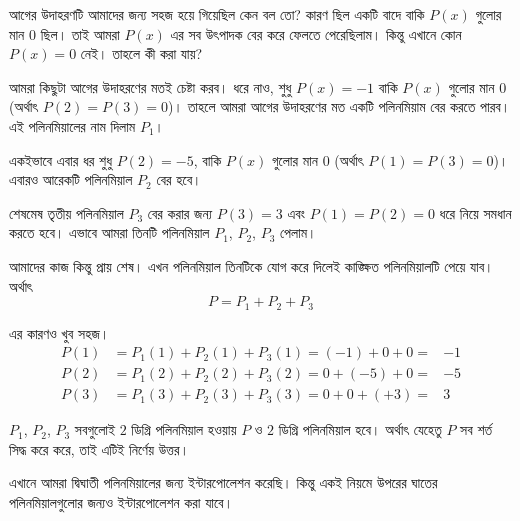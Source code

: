 \begin{solution}
আগের উদাহরণটি আমাদের জন্য সহজ হয়ে গিয়েছিল কেন বল তো? কারণ ছিল একটি বাদে বাকি $P(x)$ গুলোর মান $0$ ছিল। তাই আমরা $P(x)$ এর সব উৎপাদক বের করে ফেলতে পেরেছিলাম। কিন্তু এখানে কোন $P(x) = 0$ নেই। তাহলে কী করা যায়? 

আমরা কিছুটা আগের উদাহরণের মতই চেষ্টা করব। ধরে নাও, শুধু $P(x) = -1$ বাকি $P(x)$ গুলোর মান $0$ (অর্থাৎ $P(2) = P(3) = 0$)। তাহলে আমরা আগের উদাহরণের মত একটি পলিনমিয়াম বের করতে পারব। এই পলিনমিয়ালের নাম দিলাম $P_1$। 

একইভাবে এবার ধর শুধু $P(2) = -5$, বাকি $P(x)$ গুলোর মান $0$ (অর্থাৎ $P(1) = P(3) = 0$)। এবারও আরেকটি পলিনমিয়াল $P_2$ বের হবে। 

শেষমেষ তৃতীয় পলিনমিয়াল $P_3$ বের করার জন্য $P(3) = 3$ এবং $P(1) = P(2) = 0$ ধরে নিয়ে সমধান করতে হবে। এভাবে আমরা তিনটি পলিনমিয়াল $P_1$, $P_2$, $P_3$ পেলাম। 

আমাদের কাজ কিন্তু প্রায় শেষ। এখন পলিনমিয়াল তিনটিকে যোগ করে দিলেই কাঙ্ক্ষিত পলিনমিয়ালটি পেয়ে যাব। অর্থাৎ 
$$P = P_1 + P_2 + P_3$$

এর কারণও খুব সহজ।
\begin{align*}
P(1) & = P_1(1) + P_2(1) + P_3(1) = (-1) + 0 + 0 = &-1 \\
P(2) & = P_1(2) + P_2(2) + P_3(2) = 0 + (-5) + 0 = &-5 \\
P(3) & = P_1(3) + P_2(3) + P_3(3) = 0 + 0 + (+3) = &3
\end{align*}

$P_1$, $P_2$, $P_3$ সবগুলোই $2$ ডিগ্রি পলিনমিয়াল হওয়ায় $P$ ও $2$ ডিগ্রি পলিনমিয়াল হবে। অর্থাৎ যেহেতু $P$ সব শর্ত সিদ্ধ করে করে, তাই এটিই নির্ণেয় উত্তর। 
\end{solution}

এখানে আমরা দ্বিঘাতী পলিনমিয়ালের জন্য ইন্টারপোলেশন করেছি। কিন্তু একই নিয়মে উপরের ঘাতের পলিনমিয়ালগুলোর জন্যও ইন্টারপোলেশন করা যাবে। 

